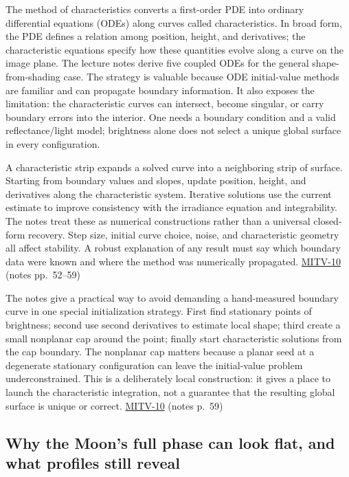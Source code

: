 The method of characteristics converts a first-order PDE into ordinary differential equations (ODEs) along curves called characteristics. In broad form, the PDE defines a relation among position, height, and derivatives; the characteristic equations specify how these quantities evolve along a curve on the image plane. The lecture notes derive five coupled ODEs for the general shape-from-shading case. The strategy is valuable because ODE initial-value methods are familiar and can propagate boundary information. It also exposes the limitation: the characteristic curves can intersect, become singular, or carry boundary errors into the interior. One needs a boundary condition and a valid reflectance/light model; brightness alone does not select a unique global surface in every configuration.

A characteristic strip expands a solved curve into a neighboring strip of surface. Starting from boundary values and slopes, update position, height, and derivatives along the characteristic system. Iterative solutions use the current estimate to improve consistency with the irradiance equation and integrability. The notes treat these as numerical constructions rather than a universal closed-form recovery. Step size, initial curve choice, noise, and characteristic geometry all affect stability. A robust explanation of any result must say which boundary data were known and where the method was numerically propagated. \hyperref[04-visual-computing-ii-ch036-mitv-10---characteristic-strip-expansion-shape-from-shading-iterative-solutions]{MITV-10} (notes pp.~52--59)

The notes give a practical way to avoid demanding a hand-measured boundary curve in one special initialization strategy. First find stationary points of brightness; second use second derivatives to estimate local shape; third create a small nonplanar cap around the point; finally start characteristic solutions from the cap boundary. The nonplanar cap matters because a planar seed at a degenerate stationary configuration can leave the initial-value problem underconstrained. This is a deliberately local construction: it gives a place to launch the characteristic integration, not a guarantee that the resulting global surface is unique or correct. \hyperref[04-visual-computing-ii-ch036-mitv-10---characteristic-strip-expansion-shape-from-shading-iterative-solutions]{MITV-10} (notes p.~59)

\subsection{Why the Moon's full phase can look flat, and what profiles still reveal}\label{04-visual-computing-ii-ch032-why-the-moons-full-phase-can-look-flat-and-what-profiles-still-reveal}

